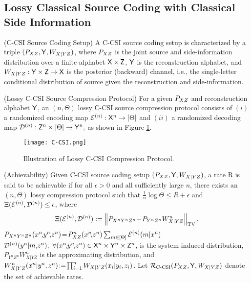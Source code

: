 \subsection{Lossy Classical Source Coding with Classical Side Information}
\begin{definition}(C-CSI Source Coding Setup) A C-CSI source coding setup is characterized by a triple $({P}_{XZ},\mathsf{Y},W_{X|YZ})$, where ${P}_{XZ}$ is the joint source and side-information distribution over a finite alphabet $\mathsf{X}\times\mathsf{Z}$, $\mathsf{Y}$ is the reconstruction alphabet, and $W_{X|YZ}:\mathsf{Y}\times\mathsf{Z} \rightarrow\mathsf{X}$ is the posterior (backward) channel, i.e., the single-letter conditional distribution of source given the reconstruction and side-information.
\end{definition}
\begin{definition}(Lossy C-CSI Source Compression Protocol) For a given ${P}_{XZ}$ and reconstruction alphabet $\mathsf{Y}$, an $(n,\Theta)$ lossy C-CSI source compression protocol consists of $(i)$ a randomized encoding map $\mathcal{E}^{(n)}:\mathsf{X}^n\rightarrow[\Theta]$ and $(ii)$ a randomized decoding map $\mathcal{D}^{(n)}:\mathsf{Z}^n \times[\Theta] \rightarrow\mathsf{Y}^n,$ as shown in Figure \ref{fig:C-CSI}.  
\end{definition}
\vspace{-3pt}
\begin{figure}[!htb]
    \centering
    \texttt{[image: C-CSI.png]}
    \vspace{-5pt}
    \caption{Illustration of Lossy C-CSI Compression Protocol.}
    \label{fig:C-CSI}
    \vspace{-3pt}
\end{figure}
\begin{definition}(Achievability) Given C-CSI source coding setup $({P}_{XZ},\mathsf{Y},W_{X|YZ})$, a rate R is said to be achievable if for all $\epsilon >0$ and all sufficiently large $n$, there exists an $(n,\Theta)$ lossy compression protocol such that $\frac{1}{n}\log\Theta \leq R+\epsilon$ and $\Xi(\mathcal{E}^{(n)},\mathcal{D}^{(n)})\leq \epsilon$, where
\begin{align}
\Xi(\calE^{(n)},\calD^{(n)}) \deq \left\|P_{X^nY^nZ^n} \!-\! P_{Y^nZ^n}W_{X|YZ}^n\right\|_{\text{TV}},\nonumber
\vspace{-10pt}
\end{align}
    $P_{X^nY^nZ^n}(\xn\!,\!\yn\!,\!\zn) \! =\!  {\pxz^n(\xn\!,\!\zn)} \sum_{m \in [\Theta]}\encodern(m|x^n)$ $\decodern(y^n|m,\!\zn),\ \forall(\xn\!,\!\yn\!,\!\zn)\in \sfX^n \times \sfY^n \times \sfZ^n$, is the system-induced distribution,
 $P_{Y^nZ^n}W_{X|YZ}^n$ is the approximating distribution, and $W_{X|YZ}^n(x^n|y^n,z^n) \!:=\! \prod_{i=1}^nW_{X|YZ}(x_i|y_i,z_i)$. Let $\mathcal{R}_{\text{C-CSI}}({P}_{XZ},\mathsf{Y},W_{X|YZ})$ denote the set of achievable rates.
\end{definition}
